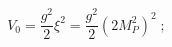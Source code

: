\begin{equation}
\label{eq:Dvacuum}
V_0 = \frac{g^2}2 \xi^2 = \frac{g^2}2 (2 M_P^2)^2 \;;  
\end{equation}

